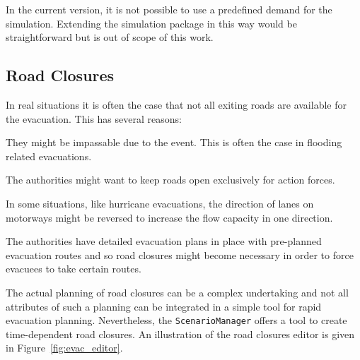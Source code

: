 In the current version, it is not possible to use a predefined demand for the simulation. Extending the simulation package in this way would be straightforward but is out of scope of this work.

\subsection{Road Closures}
In real situations it is often the case that not all exiting roads are available for the evacuation. This has several reasons:
\begin{compactitem}
\item They might be impassable due to the event. This is often the case in flooding related evacuations.
\item The authorities might want to keep roads open exclusively for action forces.
\item In some situations, like hurricane evacuations, the direction of lanes on motorways might be reversed to increase the flow capacity in one direction.
\item The authorities have detailed evacuation plans in place with pre-planned evacuation routes and so road closures might become necessary in order to force evacuees to take certain routes.
\end{compactitem}
The actual planning of road closures can be a complex undertaking and not all attributes of such a planning can be integrated in a simple tool for rapid evacuation planning. Nevertheless, the \lstinline|ScenarioManager| offers a tool to create time-dependent road closures. An illustration of the road closures editor is given in Figure~\ref{fig:evac_editor}.

